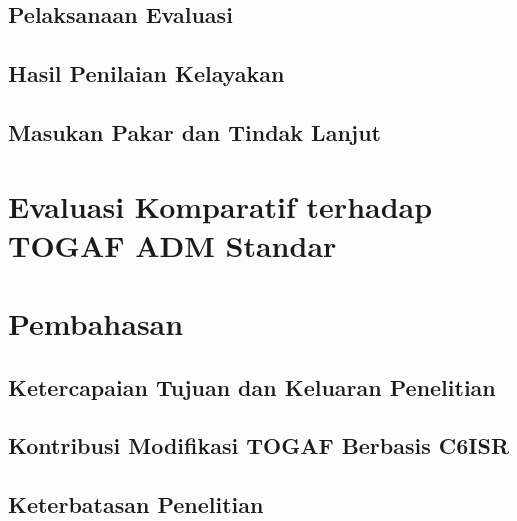 \subsection{Pelaksanaan Evaluasi}
\label{sec:V.3.1}

\subsection{Hasil Penilaian Kelayakan}
\label{sec:V.3.2}

\subsection{Masukan Pakar dan Tindak Lanjut}
\label{sec:V.3.3}

\section{Evaluasi Komparatif terhadap TOGAF ADM Standar}
\label{sec:V.4}

\section{Pembahasan}
\label{sec:V.5}

\subsection{Ketercapaian Tujuan dan Keluaran Penelitian}
\label{sec:V.5.1}

\subsection{Kontribusi Modifikasi TOGAF Berbasis C6ISR}
\label{sec:V.5.2}

\subsection{Keterbatasan Penelitian}
\label{sec:V.5.3}

